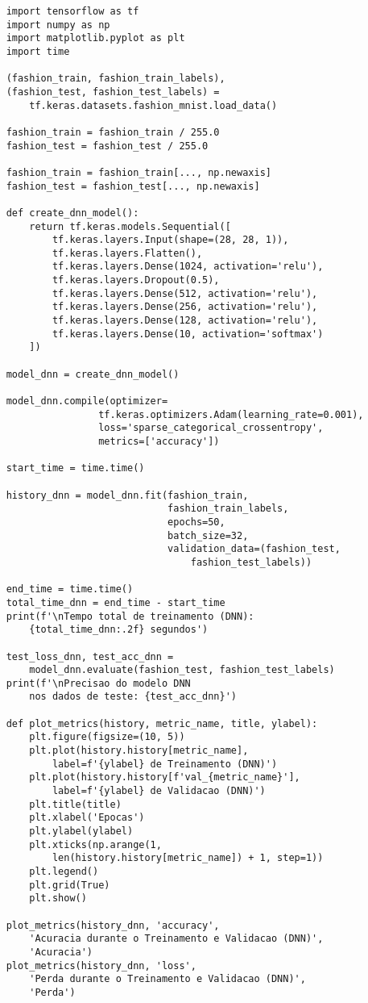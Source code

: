 \begin{lstlisting}
    import tensorflow as tf
    import numpy as np
    import matplotlib.pyplot as plt
    import time

    (fashion_train, fashion_train_labels), 
    (fashion_test, fashion_test_labels) = 
        tf.keras.datasets.fashion_mnist.load_data()

    fashion_train = fashion_train / 255.0
    fashion_test = fashion_test / 255.0

    fashion_train = fashion_train[..., np.newaxis]
    fashion_test = fashion_test[..., np.newaxis]

    def create_dnn_model():
        return tf.keras.models.Sequential([
            tf.keras.layers.Input(shape=(28, 28, 1)),
            tf.keras.layers.Flatten(),
            tf.keras.layers.Dense(1024, activation='relu'),
            tf.keras.layers.Dropout(0.5),
            tf.keras.layers.Dense(512, activation='relu'),
            tf.keras.layers.Dense(256, activation='relu'),
            tf.keras.layers.Dense(128, activation='relu'),
            tf.keras.layers.Dense(10, activation='softmax')
        ])

    model_dnn = create_dnn_model()

    model_dnn.compile(optimizer=
                    tf.keras.optimizers.Adam(learning_rate=0.001),
                    loss='sparse_categorical_crossentropy',
                    metrics=['accuracy'])

    start_time = time.time()

    history_dnn = model_dnn.fit(fashion_train, 
                                fashion_train_labels,
                                epochs=50,
                                batch_size=32,
                                validation_data=(fashion_test, 
                                    fashion_test_labels))

    end_time = time.time()
    total_time_dnn = end_time - start_time
    print(f'\nTempo total de treinamento (DNN): 
        {total_time_dnn:.2f} segundos')

    test_loss_dnn, test_acc_dnn = 
        model_dnn.evaluate(fashion_test, fashion_test_labels)
    print(f'\nPrecisao do modelo DNN 
        nos dados de teste: {test_acc_dnn}')

    def plot_metrics(history, metric_name, title, ylabel):
        plt.figure(figsize=(10, 5))
        plt.plot(history.history[metric_name], 
            label=f'{ylabel} de Treinamento (DNN)')
        plt.plot(history.history[f'val_{metric_name}'], 
            label=f'{ylabel} de Validacao (DNN)')
        plt.title(title)
        plt.xlabel('Epocas')
        plt.ylabel(ylabel)
        plt.xticks(np.arange(1, 
            len(history.history[metric_name]) + 1, step=1))
        plt.legend()
        plt.grid(True)
        plt.show()

    plot_metrics(history_dnn, 'accuracy', 
        'Acuracia durante o Treinamento e Validacao (DNN)', 
        'Acuracia')
    plot_metrics(history_dnn, 'loss', 
        'Perda durante o Treinamento e Validacao (DNN)', 
        'Perda')
\end{lstlisting}